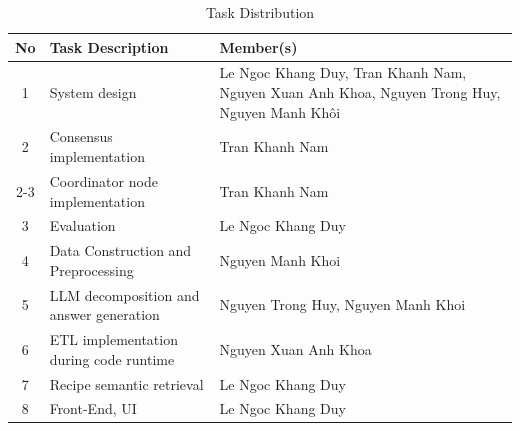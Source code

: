 \documentclass[conference]{IEEEtran}
\begin{document}
\begin{table}[h]
\centering
\footnotesize
\renewcommand{\arraystretch}{1.2}
\caption{Task Distribution}
\label{tab:task_distribution}

\begin{tabular}{|c|p{3.0cm}|p{3.4cm}|}
\hline
\textbf{No} & \textbf{Task Description} & \textbf{Member(s)} \\ \hline

1 &
System design &
Le Ngoc Khang Duy, Tran Khanh Nam, Nguyen Xuan Anh Khoa, Nguyen Trong Huy, Nguyen Manh Khôi \\ \hline

2 &
Consensus implementation &
Tran Khanh Nam \\ \cline{2-3}

&
Coordinator node implementation &
Tran Khanh Nam \\ \hline

3 &
Evaluation &
Le Ngoc Khang Duy \\ \hline

4 &
Data Construction and Preprocessing &
Nguyen Manh Khoi \\ \hline

5 &
LLM decomposition and answer generation &
Nguyen Trong Huy, Nguyen Manh Khoi \\ \hline

6 &
ETL implementation during code runtime &
Nguyen Xuan Anh Khoa \\ \hline

7 &
Recipe semantic retrieval &
Le Ngoc Khang Duy \\ \hline

8 &
Front-End, UI &
Le Ngoc Khang Duy \\ \hline

\end{tabular}
\end{table}






 
 
\end{document}
